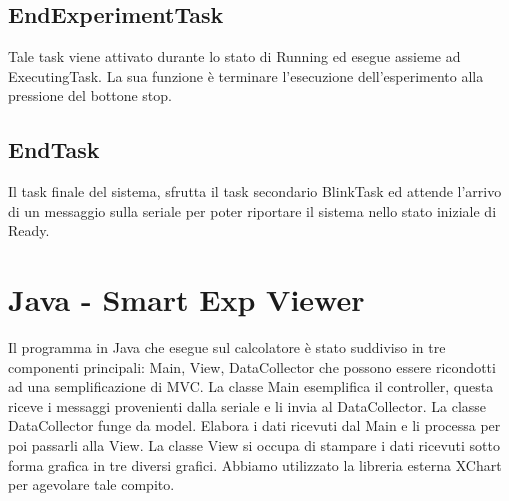 \documentclass[a4paper,12pt]{report}
\begin{document}
\section{EndExperimentTask}
Tale task viene attivato durante lo stato di Running ed esegue assieme ad ExecutingTask. La sua funzione è terminare l'esecuzione dell'esperimento alla pressione del bottone stop.

\section{EndTask}
Il task finale del sistema, sfrutta il task secondario BlinkTask ed attende l'arrivo di un messaggio sulla seriale per poter riportare il sistema nello stato iniziale di Ready.

\chapter{Java - Smart Exp Viewer}
Il programma in Java che esegue sul calcolatore è stato suddiviso in tre componenti principali: Main, View, DataCollector che possono essere ricondotti ad una semplificazione di MVC.
La classe Main esemplifica il controller, questa riceve i messaggi provenienti dalla seriale e li invia al DataCollector.
La classe DataCollector funge da model. Elabora i dati ricevuti dal Main e li processa per poi passarli alla View.
La classe View si occupa di stampare i dati ricevuti sotto forma grafica in tre diversi grafici. Abbiamo utilizzato la libreria esterna XChart per agevolare tale compito.
\end{document}
